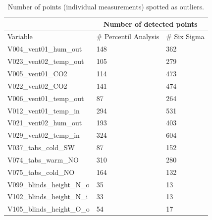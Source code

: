 \begin{table}[]
\centering
\caption{Number of points (individual measurements) spotted as outliers.}
\label{tab:six_perc}
\tiny
\begin{tabular}{l|l|l|}
\cline{2-3}
                                                 & \multicolumn{2}{c|}{Number of detected points} \\ \hline
\multicolumn{1}{|l|}{Variable}                   & \# Percentil Analysis      & \# Six Sigma      \\ \hline
\multicolumn{1}{|l|}{V004\_vent01\_hum\_out}     & 148                        & 362               \\ \hline
\multicolumn{1}{|l|}{V023\_vent02\_temp\_out}    & 105                        & 279               \\ \hline
\multicolumn{1}{|l|}{V005\_vent01\_CO2}          & 114                        & 473               \\ \hline
\multicolumn{1}{|l|}{V022\_vent02\_CO2}          & 141                        & 474               \\ \hline
\multicolumn{1}{|l|}{V006\_vent01\_temp\_out}    & 87                         & 264               \\ \hline
\multicolumn{1}{|l|}{V012\_vent01\_temp\_in}     & 294                        & 531               \\ \hline
\multicolumn{1}{|l|}{V021\_vent02\_hum\_out}     & 193                        & 403               \\ \hline
\multicolumn{1}{|l|}{V029\_vent02\_temp\_in}     & 324                        & 604               \\ \hline
\multicolumn{1}{|l|}{V037\_tabs\_cold\_SW}       & 87                         & 152               \\ \hline
\multicolumn{1}{|l|}{V074\_tabs\_warm\_NO}       & 310                        & 280               \\ \hline
\multicolumn{1}{|l|}{V075\_tabs\_cold\_NO}       & 164                        & 132               \\ \hline
\multicolumn{1}{|l|}{V099\_blinds\_height\_N\_o} & 35                         & 13                \\ \hline
\multicolumn{1}{|l|}{V102\_blinds\_height\_N\_i} & 33                         & 13                \\ \hline
\multicolumn{1}{|l|}{V105\_blinds\_height\_O\_o} & 54                         & 17                \\ \hline

\end{tabular}
\end{table}
